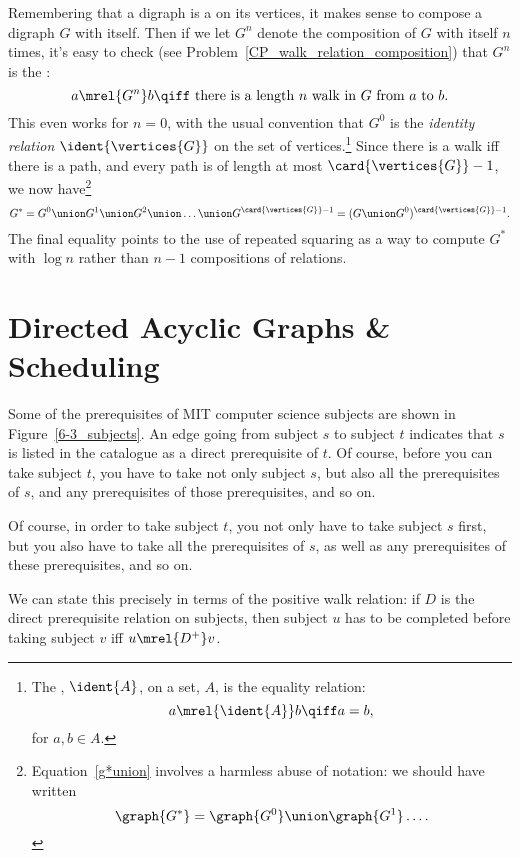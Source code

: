 Remembering that a digraph is a  on its vertices, it
makes sense to compose a digraph $G$ with itself.  Then if we let
$G^n$ denote the composition of $G$ with itself $n$ times, it's easy
to check (see Problem~\ref{CP_walk_relation_composition}) that $G^n$
is the :
\[
a  \mrel{G^n} b \qiff \mbox{ there is a length $n$ walk in $G$ from $a$ to $b$}.
\]
This even works for $n=0$, with the usual convention that $G^0$ is the
\emph{identity relation} $\ident{\vertices{G}}$ on the set of
vertices.\footnote{The , $\ident{A}$, on a set, $A$,
  is the equality relation:
\[
a \mrel{\ident{A}} b \qiff a  = b,
\]
for $a,b \in A$.}  Since there is a walk iff there is a path,
and every path is of length at most $\card{\vertices{G}}-1$, 
we now have\footnote{Equation~\eqref{g*union} involves a harmless
  abuse of notation: we should have written
\[
\graph{G^*} = \graph{G^0} \union \graph{G^1} \dots.
\]
}
\begin{equation}\label{g*union}
G^* = G^0 \union G^1 \union G^2 \union \dots \union
G^{\card{\vertices{G}}-1} = (G \union G^0)^{\card{\vertices{G}}-1}.
\end{equation}
The final equality points to the use of repeated squaring as a way to
compute $G^*$ with $\log n$ rather than $n-1$ compositions of
relations.

\begin{problems}
\practiceproblems
{}

\homeworkproblems
{}
\end{problems}

\section{Directed Acyclic Graphs \& Scheduling}\label{dag_sec}

Some of the prerequisites of MIT computer science subjects are shown
in Figure~\ref{6-3_subjects}.  An edge going from subject $s$ to
subject $t$ indicates that $s$ is listed in the catalogue as a direct
prerequisite of $t$.  Of course, before you can take subject $t$, you
have to take not only subject $s$, but also all the prerequisites of $s$,
and any prerequisites of those prerequisites, and so on.
\begin{editingnotes} Of course, in order to take subject $t$, you
  not only have to take subject $s$ first, but you also have to take
  all the prerequisites of $s$, as well as any prerequisites of these
  prerequisites, and so on.
\end{editingnotes}
We can state this precisely in terms of the positive walk relation: if
$D$ is the direct prerequisite relation on subjects, then subject $u$
has to be completed before taking subject $v$ iff $u \mrel{D^+} v$.

